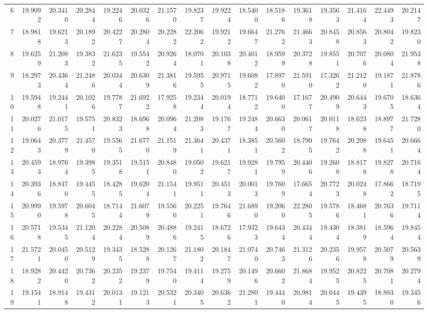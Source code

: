 \documentclass[12pt]{article}\usepackage[]{graphicx}\usepackage[]{color}
\begin{document}
\begin{landscape}
\begin{longtable}[t]{rrrrrrrrrrrrrrrr}
6 & 19.9092 & 20.3410 & 20.2844 & 19.2246 & 20.0326 & 21.1570 & 19.8237 & 19.9224 & 18.5400 & 18.5186 & 19.3618 & 19.3563 & 21.4164 & 22.4493 & 20.2147\\
7 & 18.9818 & 19.6213 & 20.1892 & 20.4227 & 20.2804 & 20.2282 & 22.2062 & 19.9212 & 19.6647 & 21.2762 & 21.4663 & 20.8458 & 20.8563 & 20.8042 & 19.8230\\
8 & 19.6259 & 21.2083 & 19.3832 & 21.6235 & 19.5542 & 20.9264 & 18.0701 & 20.1038 & 20.4012 & 18.9599 & 20.3728 & 19.8551 & 20.7076 & 20.0804 & 21.9538\\
9 & 18.2973 & 20.4364 & 21.2486 & 20.0344 & 20.6309 & 21.3816 & 19.5955 & 20.9715 & 19.6082 & 17.8970 & 21.5910 & 17.3262 & 21.2120 & 19.1871 & 21.8786\\
10 & 19.5948 & 19.2441 & 20.1026 & 19.7787 & 21.6922 & 17.9258 & 19.2344 & 20.0194 & 18.7712 & 19.6400 & 17.1677 & 20.4909 & 20.6443 & 19.6705 & 18.6364\\
11 & 20.0276 & 21.0175 & 19.5751 & 20.8323 & 18.6968 & 20.0964 & 21.2083 & 19.1767 & 19.2484 & 20.6630 & 20.0617 & 20.0118 & 18.6238 & 18.8977 & 21.7280\\
12 & 19.0643 & 20.3779 & 21.4570 & 19.5565 & 21.6770 & 21.1519 & 21.3641 & 20.4371 & 18.3851 & 20.5602 & 18.7905 & 19.7642 & 20.2088 & 19.6451 & 20.6664\\
13 & 20.4593 & 18.9764 & 19.3985 & 19.3518 & 19.5151 & 20.8480 & 19.0502 & 19.6217 & 19.9281 & 19.7959 & 20.4406 & 19.2608 & 18.8178 & 19.8278 & 20.7164\\
14 & 20.3936 & 18.8470 & 19.4455 & 18.4285 & 19.6204 & 21.1541 & 19.9511 & 20.4513 & 20.0013 & 19.7609 & 17.6654 & 20.7723 & 20.0248 & 17.8662 & 18.7195\\
15 & 20.9990 & 19.5978 & 20.6045 & 18.7144 & 21.6079 & 19.5560 & 20.2251 & 19.7646 & 21.6890 & 19.2060 & 22.2805 & 19.5786 & 18.4681 & 20.7636 & 19.7114\\
16 & 20.5718 & 19.5345 & 21.1204 & 20.2284 & 20.5089 & 20.4886 & 19.2415 & 18.6726 & 17.9323 & 19.6434 & 20.4344 & 19.4304 & 18.3819 & 18.5964 & 19.8454\\
17 & 21.5721 & 20.0450 & 20.5129 & 19.3435 & 18.5288 & 20.1267 & 21.1802 & 20.1847 & 21.0740 & 20.7463 & 21.3126 & 20.2356 & 19.9578 & 20.5079 & 20.5639\\
18 & 18.9282 & 20.4420 & 20.7362 & 20.2352 & 19.2379 & 19.7540 & 19.4114 & 19.2759 & 20.1496 & 20.6602 & 21.8684 & 19.9525 & 20.8225 & 20.7081 & 20.2794\\
19 & 19.1541 & 18.9148 & 19.4312 & 20.0131 & 19.1213 & 20.5321 & 20.3405 & 20.6362 & 21.2801 & 19.4440 & 20.9814 & 20.0445 & 19.4395 & 18.8830 & 19.3456\\

\end{longtable}
\end{landscape}
\end{document}
